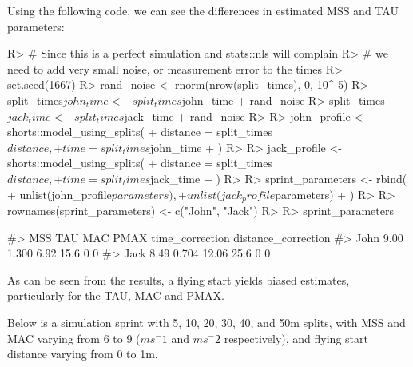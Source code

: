\documentclass[
]{jss}
\begin{document}
Using the following code, we can see the differences in estimated MSS and TAU parameters:

\begin{CodeChunk}
\begin{CodeInput}
R> # Since this is a perfect simulation and stats::nls will complain
R> # we need to add very small noise, or measurement error to the times
R> set.seed(1667)
R> rand_noise <- rnorm(nrow(split_times), 0, 10^-5)
R> split_times$john_time <- split_times$john_time + rand_noise
R> split_times$jack_time <- split_times$jack_time + rand_noise
R> 
R> john_profile <- shorts::model_using_splits(
+   distance = split_times$distance,
+   time = split_times$john_time
+ )
R> 
R> jack_profile <- shorts::model_using_splits(
+   distance = split_times$distance,
+   time = split_times$jack_time
+ )
R> 
R> sprint_parameters <- rbind(
+   unlist(john_profile$parameters),
+   unlist(jack_profile$parameters)
+ )
R> 
R> rownames(sprint_parameters) <- c("John", "Jack")
R> 
R> sprint_parameters
\end{CodeInput}
\begin{CodeOutput}
#>       MSS   TAU   MAC PMAX time_correction distance_correction
#> John 9.00 1.300  6.92 15.6               0                   0
#> Jack 8.49 0.704 12.06 25.6               0                   0
\end{CodeOutput}
\end{CodeChunk}

As can be seen from the results, a flying start yields biased estimates, particularly for the TAU, MAC and PMAX.

Below is a simulation sprint with 5, 10, 20, 30, 40, and 50m splits, with MSS and MAC varying from 6 to 9 (\(ms^-1\) and \(ms^-2\) respectively), and flying start distance varying from 0 to 1m.
\end{document}
